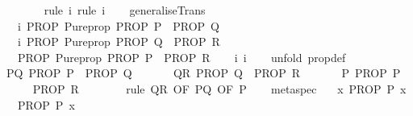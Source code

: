 \begin{isabellebody}
\ \ \ \ \ \ \isamarkupfalse%
\ {\isacharparenleft}rule\ i{}{\isacharparenright}\ {\isacharparenleft}rule\ i{}{\isacharparenright}\isanewline
\ \ \isamarkupfalse%
%
\endisatagproof
{\isafoldproof}%
%
\isadelimproof
\isanewline
%
\endisadelimproof
\isanewline
{}\isamarkupfalse%
\ generaliseTrans{\isacharcolon}\ \isanewline
\ \ \ i{}{\isacharcolon}\ {\isachardoublequoteopen}PROP\ Pure{\isachardot}prop\ {\isacharparenleft}PROP\ P\ {\isasymLongrightarrow}\ PROP\ Q{\isacharparenright}{\isachardoublequoteclose}\isanewline
\ \ \ i{}{\isacharcolon}\ {\isachardoublequoteopen}PROP\ Pure{\isachardot}prop\ {\isacharparenleft}PROP\ Q\ {\isasymLongrightarrow}\ PROP\ R{\isacharparenright}{\isachardoublequoteclose}\ \isanewline
\ \ \ {\isachardoublequoteopen}PROP\ Pure{\isachardot}prop\ {\isacharparenleft}PROP\ P\ {\isasymLongrightarrow}\ PROP\ R{\isacharparenright}{\isachardoublequoteclose}\isanewline
%
\isadelimproof
\ \ %
\endisadelimproof
%
\isatagproof
{}\isamarkupfalse%
\ i{}\ i{}\isanewline
\ \ \isamarkupfalse%
\ {\isacharparenleft}unfold\ prop{\isacharunderscore}def{\isacharparenright}\isanewline
\ \ \ \ \isamarkupfalse%
\ P{\isacharunderscore}Q{\isacharcolon}\ {\isachardoublequoteopen}PROP\ P\ {\isasymLongrightarrow}\ PROP\ Q{\isachardoublequoteclose}\ \isanewline
\ \ \ \ \isamarkupfalse%
\ Q{\isacharunderscore}R{\isacharcolon}\ {\isachardoublequoteopen}PROP\ Q\ {\isasymLongrightarrow}\ PROP\ R{\isachardoublequoteclose}\ \isanewline
\ \ \ \ \isamarkupfalse%
\ P{\isacharcolon}\ {\isachardoublequoteopen}PROP\ P{\isachardoublequoteclose}\isanewline
\ \ \ \ \isamarkupfalse%
\ {\isachardoublequoteopen}PROP\ R{\isachardoublequoteclose}\isanewline
\ \ \ \ \ \ \isamarkupfalse%
\ {\isacharparenleft}rule\ Q{\isacharunderscore}R\ {\isacharbrackleft}OF\ P{\isacharunderscore}Q\ {\isacharbrackleft}OF\ P{\isacharbrackright}{\isacharbrackright}{\isacharparenright}\isanewline
\ \ \isamarkupfalse%
%
\endisatagproof
{\isafoldproof}%
%
\isadelimproof
\isanewline
%
\endisadelimproof
\isanewline
{}\isamarkupfalse%
\ meta{\isacharunderscore}spec{\isacharcolon}\isanewline
\ \ \ {\isachardoublequoteopen}{\isasymAnd}x{\isachardot}\ PROP\ P\ x{\isachardoublequoteclose}\isanewline
\ \ \ {\isachardoublequoteopen}PROP\ P\ x{\isachardoublequoteclose}%

\end{isabellebody}
